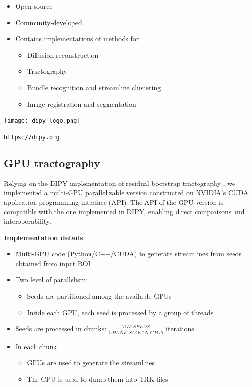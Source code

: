 \documentclass[a0, landscape]{a0poster}
\begin{document}
\begin{multicols}{3}
\begin{minipage}[b]{1\linewidth}
\begin{minipage}[b]{0.5\linewidth}
    \begin{itemize}
    \item Open-source
    \item Community-developed
    \item Contains implementations of methods for
    \begin{itemize}
        \item Diffusion reconstruction
        \item Tractography
        \item Bundle recognition and streamline clustering
        \item Image registration and segmentation
    \end{itemize}
    \end{itemize}
\end{minipage}
\begin{minipage}[b]{0.65\linewidth}
    \texttt{[image: dipy-logo.png]} \\
    \begin{centering}
    \LARGE \texttt{https://dipy.org}
    \end{centering}
\end{minipage}
\end{minipage}

\subsection*{GPU tractography}

\noindent Relying on the DIPY implementation of residual bootstrap tractography \cite{berman2008probabilistic}, we implemented a multi-GPU parallelizable version constructed on NVIDIA’s CUDA application programming interface (API).  The API of the GPU version is compatible with the one implemented in DIPY, enabling direct comparisons and interoperability.

\noindent \textbf{Implementation details}:
\begin{itemize}
    \item Multi-GPU code (Python/C++/CUDA) to generate streamlines from seeds obtained from input ROI
    \item Two level of parallelism:
    \begin{itemize}
        \item Seeds are partitioned among the available GPUs
        \item Inside each GPU, each seed is processed by a group of threads
    \end{itemize}
    \item Seeds are processed in chunks: $\frac{TOT\_SEEDS}{CHUNK\_SIZE * N\_GPUS}$ iterations
    \item In each chunk
    \begin{itemize}
        \item GPUs are used to generate the streamlines
        \item The CPU is used to dump them into TRK files
    \end{itemize}
\end{itemize}


\end{multicols}
\end{document}

